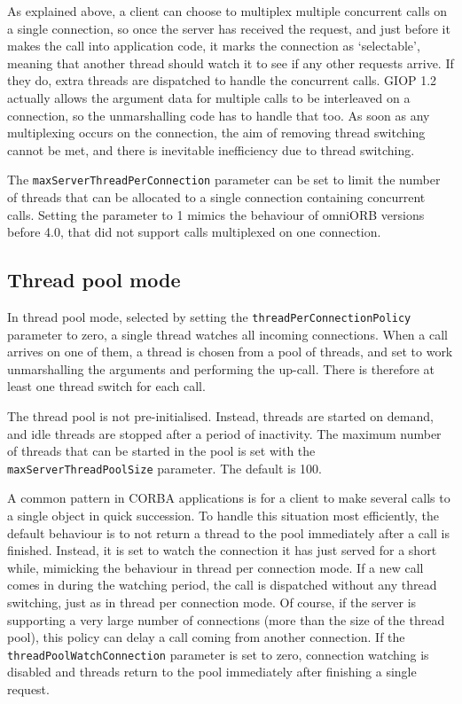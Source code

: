 \documentclass[11pt,oneside,a4paper]{book}
\newcommand{\code}[1]{\texttt{#1}}
\newcommand{\dsc}{\discretionary{}{}{}}
\begin{document}
As explained above, a client can choose to multiplex multiple
concurrent calls on a single connection, so once the server has
received the request, and just before it makes the call into
application code, it marks the connection as `selectable', meaning
that another thread should watch it to see if any other requests
arrive. If they do, extra threads are dispatched to handle the
concurrent calls. GIOP 1.2 actually allows the argument data for
multiple calls to be interleaved on a connection, so the unmarshalling
code has to handle that too. As soon as any multiplexing occurs on the
connection, the aim of removing thread switching cannot be met, and
there is inevitable inefficiency due to thread switching.

The \code{maxServerThreadPerConnection} parameter can be set to limit
the number of threads that can be allocated to a single connection
containing concurrent calls. Setting the parameter to 1 mimics the
behaviour of omniORB versions before 4.0, that did not support
calls multiplexed on one connection.


\subsection{Thread pool mode}
\label{sec:watchConn}

In thread pool mode, selected by setting the
\code{threadPerConnectionPolicy} parameter to zero, a single thread
watches all incoming connections. When a call arrives on one of them,
a thread is chosen from a pool of threads, and set to work
unmarshalling the arguments and performing the up-call. There is
therefore at least one thread switch for each call.

The thread pool is not pre-initialised. Instead, threads are started
on demand, and idle threads are stopped after a period of inactivity.
The maximum number of threads that can be started in the pool is set
with the \code{maxServer\dsc{}ThreadPoolSize} parameter. The default
is 100.

A common pattern in CORBA applications is for a client to make several
calls to a single object in quick succession. To handle this situation
most efficiently, the default behaviour is to not return a thread to
the pool immediately after a call is finished. Instead, it is set to
watch the connection it has just served for a short while, mimicking
the behaviour in thread per connection mode. If a new call comes in
during the watching period, the call is dispatched without any thread
switching, just as in thread per connection mode. Of course, if the
server is supporting a very large number of connections (more than the
size of the thread pool), this policy can delay a call coming from
another connection. If the \code{threadPoolWatch\dsc{}Connection}
parameter is set to zero, connection watching is disabled and threads
return to the pool immediately after finishing a single request.
\end{document}
